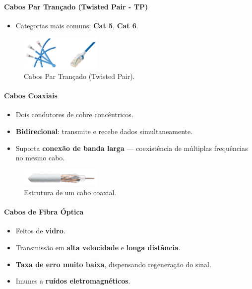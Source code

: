     \paragraph{Cabos Par Trançado (Twisted Pair - TP)} 
    \begin{itemize}[left=0.5cm, align=left, nosep]    
        \item Categorias mais comuns: \textbf{Cat 5}, \textbf{Cat 6}.
    \end{itemize}

    \begin{figure}[H]
        \centering
        \includegraphics[width=0.35\textwidth]{img/cap-01/cabos-tp.png}
        \caption{Cabos Par Trançado (Twisted Pair).}
    \end{figure}

    \paragraph{Cabos Coaxiais}
    \begin{itemize}[left=0.5cm, align=left, nosep]
        \item Dois condutores de cobre concêntricos.
        \item \textbf{Bidirecional}: transmite e recebe dados simultaneamente.
        \item Suporta \textbf{conexão de banda larga} — coexistência de múltiplas frequências no mesmo cabo.
    \end{itemize}

    \begin{figure}[H]
        \centering
        \includegraphics[width=0.35\textwidth]{img/cap-01/cabo-coaxial.png}
        \caption{Estrutura de um cabo coaxial.}
    \end{figure}

    \paragraph{Cabos de Fibra Óptica}
    \begin{itemize}[left=0.5cm, align=left, nosep]
        \item Feitos de \textbf{vidro}.
        \item Transmissão em \textbf{alta velocidade} e \textbf{longa distância}.
        \item \textbf{Taxa de erro muito baixa}, dispensando regeneração do sinal.
        \item Imunes a \textbf{ruídos eletromagnéticos}.
    \end{itemize}

